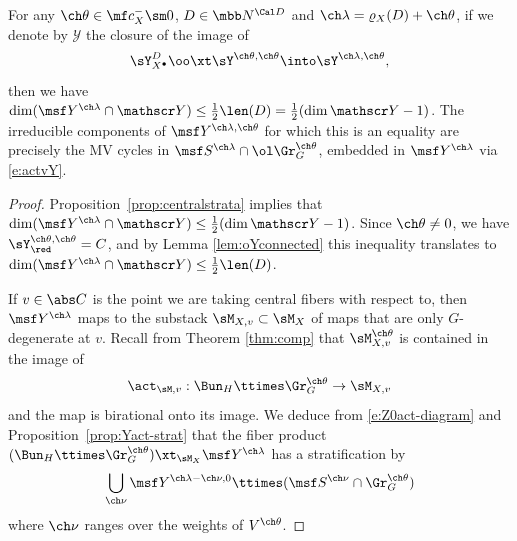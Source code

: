 \begin{lem}
\notready \label{lem:centralfibertheta}
For any $\ch\theta \in \mf c_X^- \sm 0$, $D\in \mbb N^{\Cal D}$
and $\ch\lambda = \varrho_X(D) +\ch\theta$, if we denote by $\mathscr Y$ the closure of the image of
\[\sY^{D}_{X^\bullet} \oo\xt \sY^{\ch\theta,\ch\theta} \into \sY^{\ch\lambda,\ch\theta},
\]
then we have $\dim (\msf Y^{\ch\lambda}\cap \mathscr Y) \le \frac 1 2\len(D) = \frac 1 2(\dim \mathscr Y -1)$. The irreducible components of $\msf Y^{\ch\lambda,\ch\theta}$ for which this is an equality are precisely
the MV cycles in $\msf S^{\ch\lambda}\cap \ol\Gr^{\ch\theta}_G$,
embedded in $\msf Y^{\ch\lambda}$ via \eqref{e:actvY}.
\end{lem}
\begin{proof}
Proposition~\ref{prop:centralstrata} implies that $\dim(\msf Y^{\ch\lambda} \cap \mathscr Y)
\le \frac 1 2(\dim \mathscr Y -1)$.
Since $\ch\theta\ne 0$, we have $\sY^{\ch\theta,\ch\theta}_\red=C$,  and by Lemma \ref{lem:oYconnected} this inequality translates to
$\dim(\msf Y^{\ch\lambda} \cap \mathscr Y) \le \frac 1 2 \len(D)$.

If $v\in \abs C$ is the point we are taking central fibers with respect to,
then $\msf Y^{\ch\lambda}$ maps to
the substack $\sM_{X,v}\subset \sM_{X}$ of maps that are only $G$-degenerate at $v$.
Recall from Theorem \ref{thm:comp} that $\sM_{X,v}^{\ch\theta}$
is contained in the image of
\[
    \act_{\sM,v} : \Bun_{H} \ttimes \Gr_{G}^{\ch\theta} \to \sM_{X,v}
\]
and the map is birational onto its image.
We deduce from \eqref{e:Z0act-diagram} and
Proposition~\ref{prop:Yact-strat} that the fiber product
$(\Bun_{H} \ttimes \Gr^{\ch\theta}_G) \xt_{\sM_{X}} \msf Y^{\ch\lambda}$
has a stratification by
\[ \bigcup_{\ch\nu} \msf Y^{\ch\lambda-\ch\nu,0} \ttimes (\msf S^{\ch\nu} \cap \Gr^{\ch\theta}_G)
\]
where $\ch\nu$ ranges over the weights of $V^{\ch\theta}$.


\end{proof}
